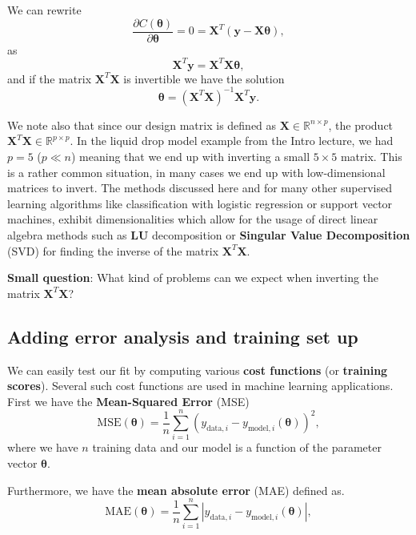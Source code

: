 \documentclass[%
oneside,                 %
final,                   %
10pt]{article}
\newenvironment{block_mdfboxadmon}[1][]{
\begin{block_mdfboxmdframed}[frametitle=#1]
}
{
\end{block_mdfboxmdframed}
}
\begin{document}
\begin{block_mdfboxadmon}[]
We can rewrite
\[
\frac{\partial C(\bm{\theta})}{\partial \bm{\theta}} = 0 = \bm{X}^T\left( \bm{y}-\bm{X}\bm{\theta}\right),  
\]
as
\[
\bm{X}^T\bm{y} = \bm{X}^T\bm{X}\bm{\theta},  
\]
and if the matrix $\bm{X}^T\bm{X}$ is invertible we have the solution
\[
\bm{\theta} =\left(\bm{X}^T\bm{X}\right)^{-1}\bm{X}^T\bm{y}.
\]

We note also that since our design matrix is defined as $\bm{X}\in
{\mathbb{R}}^{n\times p}$, the product $\bm{X}^T\bm{X} \in
{\mathbb{R}}^{p\times p}$.  In the liquid drop model example from the Intro lecture, we had $p=5$ ($p \ll n$) meaning that we end up with inverting a small
$5\times 5$ matrix. This is a rather common situation, in many cases we end up with low-dimensional
matrices to invert. The methods discussed here and for many other
supervised learning algorithms like classification with logistic
regression or support vector machines, exhibit dimensionalities which
allow for the usage of direct linear algebra methods such as \textbf{LU} decomposition or \textbf{Singular Value Decomposition} (SVD) for finding the inverse of the matrix
$\bm{X}^T\bm{X}$.
\end{block_mdfboxadmon} %




\begin{block_mdfboxadmon}[]
\textbf{Small question}: What kind of problems can we expect when inverting the matrix  $\bm{X}^T\bm{X}$?
\end{block_mdfboxadmon} %



\subsection{Adding error analysis and training set up}

We can easily test our fit by computing various \textbf{cost functions} (or \textbf{training scores}). Several such cost functions are used in machine learning applications. First we have the \textbf{Mean-Squared Error} (MSE)
\[
\mathrm{MSE}(\bm{\theta}) = \frac{1}{n} \sum_{i=1}^n \left( y_{\mathrm{data},i} - y_{\mathrm{model},i}(\bm{\theta}) \right)^2,
\]
where we have $n$ training data and our model is a function of the parameter vector $\bm{\theta}$.

Furthermore, we have the \textbf{mean absolute error} (MAE) defined as.
\[
\mathrm{MAE}(\bm{\theta}) = \frac{1}{n} \sum_{i=1}^n \left| y_{\mathrm{data},i} - y_{\mathrm{model},i}(\bm{\theta}) \right|,
\]
\end{document}
